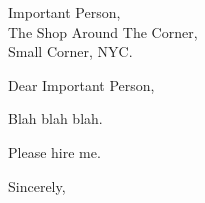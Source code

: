 \documentclass[10pt]{letter}
\begin{document}
\begin{letter}
{
    Important Person,\\
    The Shop Around The Corner,\\
    Small Corner, NYC.
}

\opening{Dear Important Person,}


Blah blah blah.

Please hire me.

\closing{Sincerely,}

\end{letter}
\end{document}
